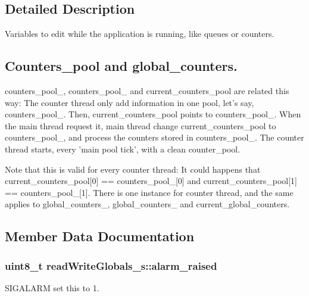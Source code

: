 \subsection{Detailed Description}
Variables to edit while the application is running, like queues or counters.

\subsection*{Counters\+\_\+pool and global\+\_\+counters.}

counters\+\_\+pool\+\_, counters\+\_\+pool\+\_ and current\+\_\+counters\+\_\+pool are related this way\+: The counter thread only add information in one pool, let's say, counters\+\_\+pool\+\_. Then, current\+\_\+counters\+\_\+pool points to counters\+\_\+pool\+\_. When the main thread request it, main thread change current\+\_\+counters\+\_\+pool to counters\+\_\+pool\+\_, and process the counters stored in counters\+\_\+pool\+\_. The counter thread starts, every 'main pool tick', with a clean counter\+\_\+pool.

Note that this is valid for every counter thread\+: It could happens that current\+\_\+counters\+\_\+pool[0] == counters\+\_\+pool\+\_[0] and current\+\_\+counters\+\_\+pool[1] == counters\+\_\+pool\+\_[1]. There is one instance for counter thread, and the same applies to global\+\_\+counters\+\_, global\+\_\+counters\+\_ and current\+\_\+global\+\_\+counters. 

\subsection{Member Data Documentation}
\subsubsection[{alarm\+\_\+raised}]{\setlength{\rightskip}{0pt plus 5cm}uint8\+\_\+t read\+Write\+Globals\+\_\+s\+::alarm\+\_\+raised}\label{structread_write_globals__s_a58ff2cc5c84ad23fbd7c33150e6e9513}


S\+I\+G\+A\+L\+A\+R\+M set this to 1. 


